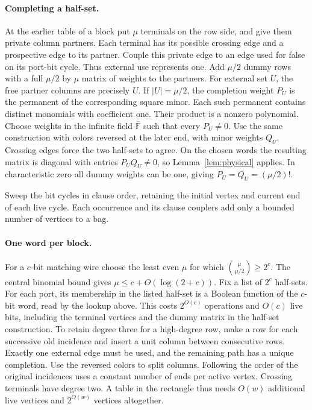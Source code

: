 \documentclass[11pt]{article}
\theoremstyle{definition}
\newcommand{\F}{\mathbb F}
\newcommand{\olF}{\overline{\F}}
\begin{document}
\paragraph{Completing a half-set.}
At the earlier table of a block put \(\mu\) terminals on the row side, and give them private column partners. Each terminal has its possible crossing edge and a prospective edge to its partner. Couple this private edge to an edge used for false on its port-bit cycle. Thus external use represents one. Add \(\mu/2\) dummy rows with a full \(\mu/2\) by \(\mu\) matrix of weights to the partners. For external set \(U\), the free partner columns are precisely \(U\). If \(|U|=\mu/2\), the completion weight \(P_U\) is the permanent of the corresponding square minor. Each such permanent contains distinct monomials with coefficient one. Their product is a nonzero polynomial. Choose weights in the infinite field \(\olF\) such that every \(P_U\ne0\). Use the same construction with colors reversed at the later end, with minor weights \(Q_U\). Crossing edges force the two half-sets to agree. On the chosen words the resulting matrix is diagonal with entries \(P_U Q_U\ne0\), so Lemma~\ref{lem:physical} applies. In characteristic zero all dummy weights can be one, giving \(P_U=Q_U=(\mu/2)!\).

Sweep the bit cycles in clause order, retaining the initial vertex and current end of each live cycle. Each occurrence and its clause couplers add only a bounded number of vertices to a bag.

\paragraph{One word per block.}
For a \(c\)-bit matching wire choose the least even \(\mu\) for which \(\binom \mu{\mu/2}\ge2^c\). The central binomial bound gives \(\mu\le c+O(\log(2+c))\). Fix a list of \(2^c\) half-sets. For each port, its membership in the listed half-set is a Boolean function of the \(c\)-bit word, read by the lookup above. This costs \(2^{O(c)}\) operations and \(O(c)\) live bits, including the terminal vertices and the dummy matrix in the half-set construction. To retain degree three for a high-degree row, make a row for each successive old incidence and insert a unit column between consecutive rows. Exactly one external edge must be used, and the remaining path has a unique completion. Use the reversed colors to split columns. Following the order of the original incidences uses a constant number of ends per active vertex. Crossing terminals have degree two. A table in the rectangle thus needs \(O(w)\) additional live vertices and \(2^{O(w)}\) vertices altogether.
\end{document}
